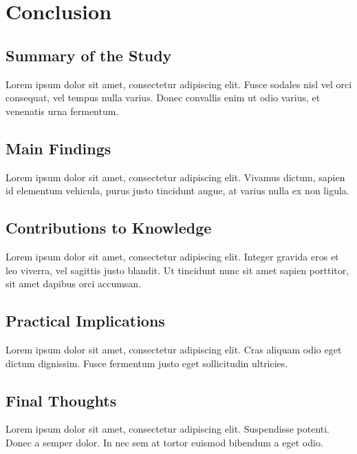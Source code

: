 \chapter{Conclusion}
\section{Summary of the Study}
Lorem ipsum dolor sit amet, consectetur adipiscing elit. Fusce sodales nisl vel orci consequat, vel tempus nulla varius. Donec convallis enim ut odio varius, et venenatis urna fermentum.

\section{Main Findings}
Lorem ipsum dolor sit amet, consectetur adipiscing elit. Vivamus dictum, sapien id elementum vehicula, purus justo tincidunt augue, at varius nulla ex non ligula.

\section{Contributions to Knowledge}
Lorem ipsum dolor sit amet, consectetur adipiscing elit. Integer gravida eros et leo viverra, vel sagittis justo blandit. Ut tincidunt nunc sit amet sapien porttitor, sit amet dapibus orci accumsan.

\section{Practical Implications}
Lorem ipsum dolor sit amet, consectetur adipiscing elit. Cras aliquam odio eget dictum dignissim. Fusce fermentum justo eget sollicitudin ultricies.

\section{Final Thoughts}
Lorem ipsum dolor sit amet, consectetur adipiscing elit. Suspendisse potenti. Donec a semper dolor. In nec sem at tortor euismod bibendum a eget odio.